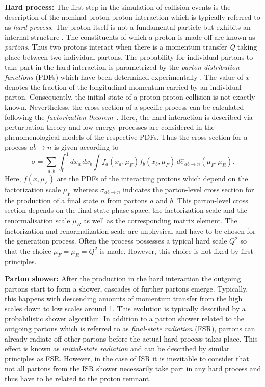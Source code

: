 \begin{description} 
 \item \textbf{Hard process:} The first step in the simulation of collision events is the description of the nominal proton-proton interaction which is typically referred to as \textit{hard process}. The proton itself is not a fundamental particle but exhibits an internal structure . The constituents of which a proton is made off are known as \textit{partons}. Thus two protons interact when there is a momentum transfer \textit{Q} taking place between two individual partons. The probability for individual partons to take part in the hard interaction is parametrized by the \textit{parton-distribution functions} (PDFs) which have been determined experimentally . The value of $x$ denotes the fraction of the longitudinal momentum carried by an individual parton. Consequently, the initial state of a proton-proton collision is not exactly known. Nevertheless, the cross section of a specific process can be calculated following the \textit{factorization theorem}~\cite{Collins:1987pm, Collins:1989gx}. Here, the hard interaction is described via perturbation theory and low-energy processes are considered in the phenomenological models of the respective PDFs. Thus the cross section for a process $ab \rightarrow n$ is given according to
\begin{equation}
 \sigma = \sum_{a,b} \int_{0}^{1} dx_{a} \, dx_{b} \int f_{a}(x_{a}, \mu_{F}) f_{b}(x_{b}, \mu_{F}) \, d\hat{\sigma}_{ab \rightarrow n} (\mu_{F}, \mu_{R}). 
\end{equation}
Here, $f(x, \mu_{F})$ are the PDFs of the interacting protons which depend on the factorization scale $\mu_{F}$ whereas $\sigma_{ab \rightarrow n}$ indicates the parton-level cross section for the production of a final state $n$ from partons $a$ and $b$. This parton-level cross section depends on the final-state phase space, the factorization scale and the renormalisation scale $\mu_{R}$ as well as the corresponding matrix element. The factorization and renormalization scale are unphysical and have to be chosen for the generation process. Often the process possesses a typical hard scale $Q^{2}$ so that the choice $\mu_{F} = \mu_{R} = Q^{2}$ is made. However, this choice is not fixed by first principles.
\item \textbf{Parton shower:} After the production in the hard interaction the outgoing partons start to form a shower, \ie cascades of further partons emerge. Typically, this happens with descending amounts of momentum transfer from the high scales down to low scales around 1\gev. This evolution is typically described by a probabilistic shower algorithm. In addition to a parton shower related to the outgoing partons which is referred to as \textit{final-state radiation} (FSR), partons can already radiate off other partons before the actual hard process takes place. This effect is known as \textit{initial-state radiation} and can be described by similar principles as FSR. However, in the case of ISR it is inevitable to consider that not all partons from the ISR shower necessarily take part in any hard process and thus have to be related to the proton remnant.  

\end{description}
